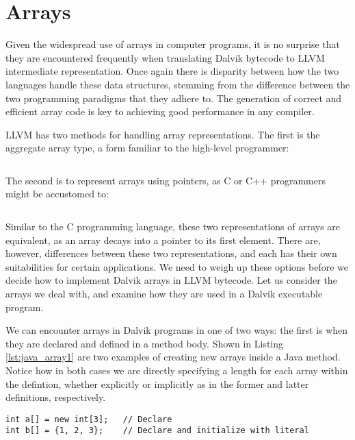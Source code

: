 \section{Arrays}
\label{sec:arrays}

Given the widespread use of arrays in computer programs, it is no surprise that they are encountered frequently when translating Dalvik bytecode to LLVM intermediate representation. Once again there is disparity between how the two languages handle these data structures, stemming from the difference between the two programming paradigms that they adhere to. The generation of correct and efficient array code is key to achieving good performance in any compiler.

LLVM has two methods for handling array representations. The first is the aggregate array type, a form familiar to the high-level programmer:

\lstset{
	language=Assembly,
	basicstyle=\small,
	stringstyle=\ttfamily
}
\begin{lstlisting}[frame=single]
%array = [<# elements> x <element type>]
\end{lstlisting}

The second is to represent arrays using pointers, as C or C++ programmers might be accustomed to:

\begin{lstlisting}[frame=single]
%array = <element type>*
\end{lstlisting}

Similar to the C programming language, these two representations of arrays are equivalent, as an array decays into a pointer to its first element. There are, however, differences between these two representations, and each has their own suitabilities for certain applications. We need to weigh up these options before we decide how to implement Dalvik arrays in LLVM bytecode. Let us consider the arrays we deal with, and examine how they are used in a Dalvik executable program.

We can encounter arrays in Dalvik programs in one of two ways: the first is when they are declared and defined in a method body. Shown in Listing \ref{lst:java_array1} are two examples of creating new arrays inside a Java method. Notice how in both cases we are directly specifying a length for each array within the defintion, whether explicitly or implicitly as in the former and latter definitions, respectively.

\lstset{
	language=Java,
	basicstyle=\small,
	stringstyle=\ttfamily
}
\begin{lstlisting}[frame=single, caption={Java arrays}, label={lst:java_array1}]
int a[] = new int[3];   // Declare
int b[] = {1, 2, 3};    // Declare and initialize with literal
\end{lstlisting}


